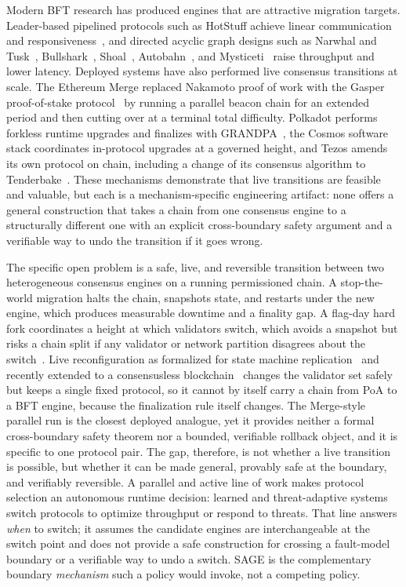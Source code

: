 \documentclass[journal]{IEEEtran}
\theoremstyle{remark}
\begin{document}
Modern BFT research has produced engines that are attractive migration targets.
Leader-based pipelined protocols such as HotStuff achieve linear communication and
responsiveness~\cite{hotstuff}, and directed acyclic graph designs such as Narwhal and
Tusk~\cite{narwhal}, Bullshark~\cite{bullshark}, Shoal~\cite{shoal},
Autobahn~\cite{autobahn}, and Mysticeti~\cite{mysticeti} raise throughput and lower
latency. Deployed systems have also performed live consensus transitions at scale. The
Ethereum Merge replaced Nakamoto proof of work with the Gasper proof-of-stake
protocol~\cite{gasper,casperffg} by running a parallel beacon chain for an extended period
and then cutting over at a terminal total difficulty. Polkadot performs forkless runtime
upgrades and finalizes with GRANDPA~\cite{grandpa}, the Cosmos software stack coordinates
in-protocol upgrades at a governed height, and Tezos amends its own protocol on chain,
including a change of its consensus algorithm to Tenderbake~\cite{tenderbake}. These
mechanisms demonstrate that live transitions are feasible and valuable, but each is a
mechanism-specific engineering artifact: none offers a general construction that takes a
chain from one consensus engine to a structurally different one with an explicit
cross-boundary safety argument and a verifiable way to undo the transition if it
goes wrong.

The specific open problem is a safe, live, and reversible transition between two
heterogeneous consensus engines on a running permissioned chain. A stop-the-world
migration halts the chain, snapshots state, and restarts under the new engine, which
produces measurable downtime and a finality gap. A flag-day hard fork coordinates a height
at which validators switch, which avoids a snapshot but risks a chain split if any
validator or network partition disagrees about the switch~\cite{tendermint,bitcoin}. Live
reconfiguration as formalized for state machine replication~\cite{reconfig,bftsmart} and
recently extended to a consensusless blockchain~\cite{suilutris} changes the validator set
safely but keeps a single fixed protocol, so it cannot by itself carry a chain from PoA to
a BFT engine, because the finalization rule itself changes. The Merge-style parallel run is
the closest deployed analogue, yet it provides neither a formal cross-boundary safety
theorem nor a bounded, verifiable rollback object, and it is specific to one protocol pair.
The gap, therefore, is not whether a live transition is possible, but whether it can be
made general, provably safe at the boundary, and verifiably reversible. A parallel and active
line of work makes protocol selection an autonomous runtime decision: learned and threat-adaptive
systems~\cite{adachain,adaptbft,threatadapt,adacon} switch protocols to optimize throughput or
respond to threats. That line answers \emph{when} to switch; it assumes the candidate engines are
interchangeable at the switch point and does not provide a safe construction for crossing a
fault-model boundary or a verifiable way to undo a switch. SAGE is the complementary boundary
\emph{mechanism} such a policy would invoke, not a competing policy.
\end{document}
